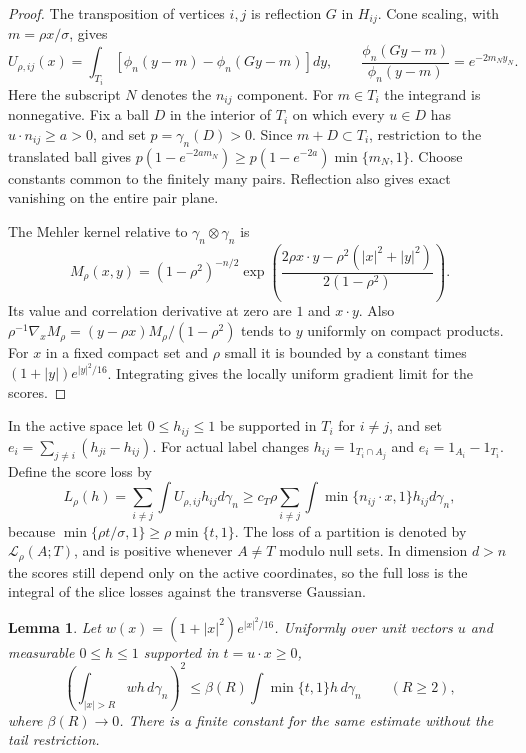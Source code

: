 \documentclass[11pt,reqno]{amsart}
\newtheorem{lemma}[theorem]{Lemma}
\newcommand{\ga}{\gamma}
\newcommand{\LL}{\mathcal L}
\begin{document}
\begin{proof}
The transposition of vertices $i,j$ is reflection $G$ in $H_{ij}$.
Cone scaling, with $m=\rho x/\sigma$, gives
\[
 U_{\rho,ij}(x)=\int_{T_i}[\phi_n(y-m)-\phi_n(Gy-m)]dy,
 \qquad \frac{\phi_n(Gy-m)}{\phi_n(y-m)}=e^{-2m_Ny_N}.
\]
Here the subscript $N$ denotes the $n_{ij}$ component.
For $m\in T_i$ the integrand is nonnegative. Fix a ball $D$ in the
interior of $T_i$ on which every $u\in D$ has $u\cdot n_{ij}\ge a>0$,
and set $p=\ga_n(D)>0$. Since $m+D\subset T_i$, restriction to the
translated ball gives
$p(1-e^{-2am_N})\ge p(1-e^{-2a})\min\{m_N,1\}$.
Choose constants common to the finitely many pairs. Reflection also
gives exact vanishing on the entire pair plane.

The Mehler kernel relative to $\ga_n\otimes\ga_n$ is
\begin{equation}\label{eq:mehler}
 M_\rho(x,y)=(1-\rho^2)^{-n/2}
 \exp\!\left(\frac{2\rho x\cdot y-\rho^2(|x|^2+|y|^2)}{2(1-\rho^2)}\right).
\end{equation}
Its value and correlation derivative at zero are $1$ and $x\cdot y$.
Also $\rho^{-1}\nabla_x M_\rho=(y-\rho x)M_\rho/(1-\rho^2)$ tends
to $y$ uniformly on compact products. For $x$ in a fixed compact
set and $\rho$ small it is bounded by a constant times
$(1+|y|)e^{|y|^2/16}$. Integrating gives the locally uniform gradient
limit for the scores.
\end{proof}

In the active space let $0\le h_{ij}\le1$ be supported in $T_i$
for $i\ne j$, and set $e_i=\sum_{j\ne i}(h_{ji}-h_{ij})$.
For actual label changes $h_{ij}=1_{T_i\cap A_j}$ and
$e_i=1_{A_i}-1_{T_i}$. Define the score loss by
\begin{equation}\label{eq:regret-cost}
 L_\rho(h)=\sum_{i\ne j}\int U_{\rho,ij}h_{ij}d\ga_n
 \ge c_T\rho\sum_{i\ne j}\int\min\{n_{ij}\cdot x,1\}h_{ij}d\ga_n,
\end{equation}
because $\min\{\rho t/\sigma,1\}\ge\rho\min\{t,1\}$.
The loss of a partition is denoted by $\LL_\rho(A;T)$, and is
positive whenever $A\ne T$ modulo null sets. In dimension $d>n$ the
scores still depend only on the active coordinates, so the full loss
is the integral of the slice losses against the transverse Gaussian.

\begin{lemma}\label{lem:weighted}
Let $w(x)=(1+|x|^2)e^{|x|^2/16}$. Uniformly over unit vectors $u$
and measurable $0\le h\le1$ supported in $t=u\cdot x\ge0$,
\begin{equation}\label{eq:weighted-tail}
 \left(\int_{|x|>R}wh\,d\ga_n\right)^2
 \le\beta(R)\int\min\{t,1\}h\,d\ga_n\qquad(R\ge2),
\end{equation}
where $\beta(R)\to0$. There is a finite constant for the same estimate
without the tail restriction.
\end{lemma}
\end{document}
